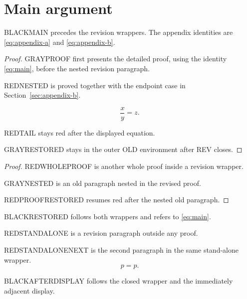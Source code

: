 \documentclass{article}
\newenvironment{OLD}{\color{previousR2}}{\ignorespacesafterend}
\newenvironment{REV}{\color{revisionR2}}{\ignorespacesafterend}
\numberwithin{equation}{section}
\begin{document}
\section{Main argument}\label{sec:main}
BLACKMAIN precedes the revision wrappers. The appendix identities are
\eqref{eq:appendix-a} and \eqref{eq:appendix-b}.

\begin{OLD}

\begin{proof}
GRAYPROOF first presents the detailed proof, using the identity
\eqref{eq:main}, before the nested revision paragraph.

\begin{REV}
REDNESTED is proved together with the endpoint case in
Section~\ref{sec:appendix-b}.

\begin{equation}\label{eq:main}
\frac{x}{y}=z.
\end{equation}

REDTAIL stays red after the displayed equation.
\end{REV}

GRAYRESTORED stays in the outer OLD environment after REV closes.
\end{proof}
\end{OLD}

\begin{REV}

\begin{proof}
REDWHOLEPROOF is another whole proof inside a revision wrapper.

\begin{OLD}
GRAYNESTED is an old paragraph nested in the revised proof.
\end{OLD}

REDPROOFRESTORED resumes red after the nested old paragraph.
\end{proof}
\end{REV}

BLACKRESTORED follows both wrappers and refers to \eqref{eq:main}.

\begin{REV}
REDSTANDALONE is a revision paragraph outside any proof.

REDSTANDALONENEXT is the second paragraph in the same stand-alone wrapper.
\end{REV}
\[
p=p.
\]

BLACKAFTERDISPLAY follows the closed wrapper and the immediately adjacent display.
\end{document}
